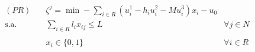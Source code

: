 \documentclass{article}
\begin{document}
\begin{align}
    (PR)\quad
        &\zeta^j = \min - \sum_{i \in R} (u^1_i - h_i u^2_i - M u^3_i) x_i - u_0\nonumber\\
    \text{s.a.}\quad
        &\sum_{i \in R} l_i x_{ij} \leq L                       & \forall j \in N\\
        \nonumber\\
        &x_i \in \{0, 1\}  & \forall i \in R
\end{align}



\end{document}
